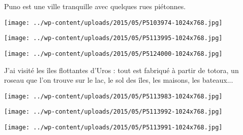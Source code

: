 Puno est une ville tranquille avec quelques rues piétonnes. 
\begin{center} \texttt{[image: ../wp-content/uploads/2015/05/P5103974-1024x768.jpg]} \end{center}
\begin{center} \texttt{[image: ../wp-content/uploads/2015/05/P5113995-1024x768.jpg]} \end{center}
\begin{center} \texttt{[image: ../wp-content/uploads/2015/05/P5124000-1024x768.jpg]} \end{center}
\pagebreak

J'ai visité les îles flottantes d'Uros : tout est fabriqué à partir de totora, un roseau que l'on trouve sur le lac, le sol des îles, les maisons, les bateaux...
\begin{center} \texttt{[image: ../wp-content/uploads/2015/05/P5113983-1024x768.jpg]} \end{center}
\begin{center} \texttt{[image: ../wp-content/uploads/2015/05/P5113992-1024x768.jpg]} \end{center}
\begin{center} \texttt{[image: ../wp-content/uploads/2015/05/P5113991-1024x768.jpg]} \end{center}
